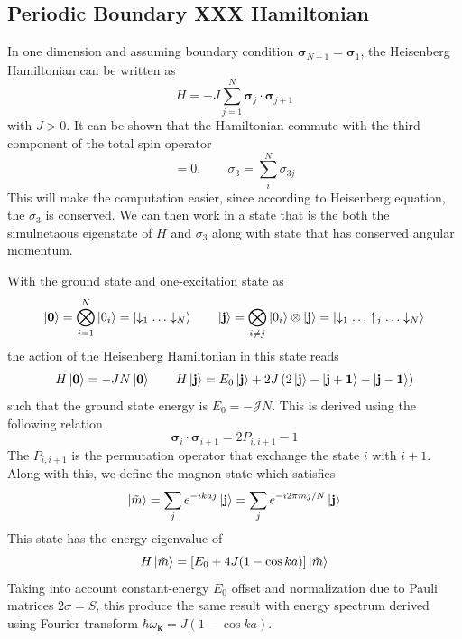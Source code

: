 \documentclass[../../../main.tex]{subfiles}
\begin{document}
\subsection{Periodic Boundary XXX Hamiltonian}
In one dimension and assuming boundary condition $\boldsymbol{\sigma}_{N+1} = \boldsymbol{\sigma}_1$, the Heisenberg Hamiltonian can be written as
\begin{equation*}
    H = -J\sum_{j=1}^{N}\boldsymbol{\sigma}_j\cdot\boldsymbol{\sigma}_{j+1}
\end{equation*}
with $J>0$.
It can be shown that the Hamiltonian commute with the third component of the total spin operator
\begin{equation*}
    [H,\sigma_3]=0,\qquad
    \sigma_3 = \sum_{i } ^N \sigma_{3j}
\end{equation*}
This will make the computation easier, since according to Heisenberg equation, the $\sigma_3$ is conserved.
We can then work in a state that is the both the simulnetaous eigenstate of $H$ and $\sigma_3$ along with state that has conserved angular momentum.

With the ground state and one-excitation state as
\begin{equation*}
    \ket{\mathbf{0 } } = \bigotimes_{i=1}^N \ket{0_i} = \ket{\downarrow_1\ldots \downarrow_N}\qquad
    \ket{\mathbf{j } } = \bigotimes_{i \neq j} \ket{0_i}\otimes \ket{\mathbf{j}} = \ket{\downarrow_1\ldots\uparrow_j\ldots \downarrow_N}
\end{equation*}
the action of the Heisenberg Hamiltonian in this state reads
\begin{equation*}
    H\ket{\mathbf{0}}
    = -JN\ket{\mathbf{0}}\qquad
    H\ket{\mathbf{j}}= E_0 \ket{\mathbf{j}} + 2J\left(2\ket{\mathbf{j}} - \ket{\mathbf{j+1}} - \ket{\mathbf{j-1}}\right)
\end{equation*}
such that the ground state energy is $E_0 = -\mathcal{J }N$.
This is derived using the following relation
\begin{equation*}
    \boldsymbol{\sigma}_i\cdot\boldsymbol{\sigma}_{i+1}=2P_{i,i+1}-1
\end{equation*}
The $P_{i,i+1}$ is the permutation operator that exchange the state $i$ with $i+1$.
Along with this, we define the magnon state which satisfies
\begin{equation*}
    \ket{\tilde{m}} = \sum_{j} e^{-ikaj} \ket{\mathbf{j}} = \sum_{j } e ^{-i2\pi m j/N} \ket{\mathbf{j}}
\end{equation*}
This state has the energy eigenvalue of
\begin{equation*}
    H \ket{\tilde{m} }= \left[ E_0 +4J (1- \cos ka) \right] \ket{\tilde{m}}
\end{equation*}
Taking into account constant-energy $E_0$ offset and normalization due to Pauli matrices $2\sigma = S$, this produce the same result with energy spectrum derived using Fourier transform $\hbar \omega_\mathbf{k} = J(1- \cos ka)$.
\end{document}
